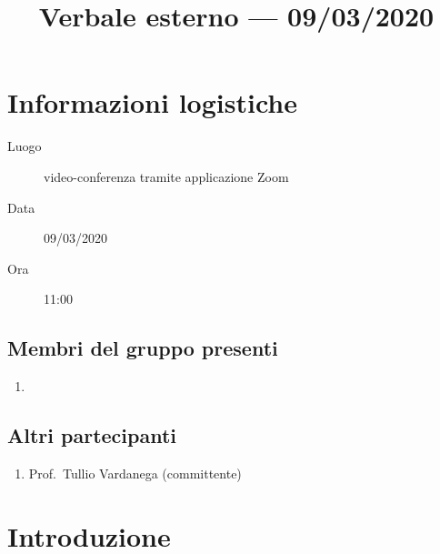 \documentclass{article}
\title{Verbale esterno --- 09/03/2020}
\begin{document}


\section{Informazioni logistiche}%
\label{sec:informazioni_logistiche}

\begin{description}
  \item [Luogo] video-conferenza tramite applicazione Zoom
  \item [Data] 09/03/2020
  \item [Ora] 11:00  
\end{description}

\subsection{Membri del gruppo presenti}%
\label{sub:membri_del_gruppo_presenti}

\begin{enumerate}
  \item {}
\end{enumerate}


\subsection{Altri partecipanti}%
\label{sub:altri_partecipanti}

\begin{enumerate}
  \item Prof.\ Tullio Vardanega (committente)
\end{enumerate}


\section{Introduzione}%
\label{sec:introduzione}
\end{document}
